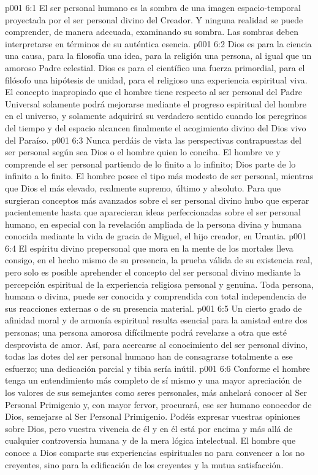 \vs p001 6:1 El ser personal humano es la sombra de una imagen espacio\hyp{}temporal proyectada por el ser personal divino del Creador. Y ninguna realidad se puede comprender, de manera adecuada, examinando su sombra. Las sombras deben interpretarse en términos de su auténtica esencia.
\vs p001 6:2 \pc Dios es para la ciencia una causa, para la filosofía una idea, para la religión una persona, al igual que un amoroso Padre celestial. Dios es para el científico una fuerza primordial, para el filósofo una hipótesis de unidad, para el religioso una experiencia espiritual viva. El concepto inapropiado que el hombre tiene respecto al ser personal del Padre Universal solamente podrá mejorarse mediante el progreso espiritual del hombre en el universo, y solamente adquirirá su verdadero sentido cuando los peregrinos del tiempo y del espacio alcancen finalmente el acogimiento divino del Dios vivo del Paraíso.
\vs p001 6:3 Nunca perdáis de vista las perspectivas contrapuestas del ser personal según sea Dios o el hombre quien lo conciba. El hombre ve y comprende el ser personal partiendo de lo finito a lo infinito; Dios parte de lo infinito a lo finito. El hombre posee el tipo más modesto de ser personal, mientras que Dios el más elevado, realmente supremo, último y absoluto. Para que surgieran conceptos más avanzados sobre el ser personal divino hubo que esperar pacientemente hasta que aparecieran ideas perfeccionadas sobre el ser personal humano, en especial con la revelación ampliada de la persona divina y humana conocida mediante la vida de gracia de Miguel, el hijo creador, en Urantia.
\vs p001 6:4 \pc El espíritu divino prepersonal que mora en la mente de los mortales lleva consigo, en el hecho mismo de su presencia, la prueba válida de su existencia real, pero solo es posible aprehender el concepto del ser personal divino mediante la percepción espiritual de la experiencia religiosa personal y genuina. Toda persona, humana o divina, puede ser conocida y comprendida con total independencia de sus reacciones externas o de su presencia material.
\vs p001 6:5 Un cierto grado de afinidad moral y de armonía espiritual resulta esencial para la amistad entre dos personas; una persona amorosa difícilmente podrá revelarse a otra que esté desprovista de amor. Así, para acercarse al conocimiento del ser personal divino, todas las dotes del ser personal humano han de consagrarse totalmente a ese esfuerzo; una dedicación parcial y tibia sería inútil.
\vs p001 6:6 Conforme el hombre tenga un entendimiento más completo de sí mismo y una mayor apreciación de los valores de sus semejantes como seres personales, más anhelará conocer al Ser Personal Primigenio y, con mayor fervor, procurará, ese ser humano conocedor de Dios, semejarse al Ser Personal Primigenio. Podéis expresar vuestras opiniones sobre Dios, pero vuestra vivencia de él y en él está por encima y más allá de cualquier controversia humana y de la mera lógica intelectual. El hombre que conoce a Dios comparte sus experiencias espirituales no para convencer a los no creyentes, sino para la edificación de los creyentes y la mutua satisfacción.

